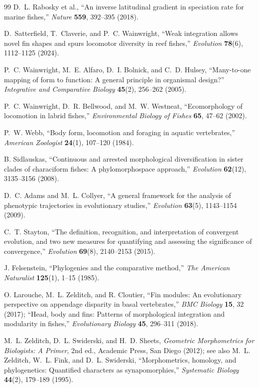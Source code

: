 \documentclass[11pt,a4paper]{article}
\theoremstyle{definition}
\theoremstyle{remark}
\begin{document}
\begin{thebibliography}{99}
D.~L. Rabosky et al., ``An inverse latitudinal gradient in speciation rate for marine fishes,'' \emph{Nature} \textbf{559}, 392--395 (2018).

D.~Satterfield, T.~Claverie, and P.~C. Wainwright, ``Weak integration allows novel fin shapes and spurs locomotor diversity in reef fishes,'' \emph{Evolution} \textbf{78}(6), 1112--1125 (2024).

P.~C. Wainwright, M.~E. Alfaro, D.~I. Bolnick, and C.~D. Hulsey, ``Many-to-one mapping of form to function: A general principle in organismal design?'' \emph{Integrative and Comparative Biology} \textbf{45}(2), 256--262 (2005).

P.~C. Wainwright, D.~R. Bellwood, and M.~W. Westneat, ``Ecomorphology of locomotion in labrid fishes,'' \emph{Environmental Biology of Fishes} \textbf{65}, 47--62 (2002).

P.~W. Webb, ``Body form, locomotion and foraging in aquatic vertebrates,'' \emph{American Zoologist} \textbf{24}(1), 107--120 (1984).

B. Sidlauskas, ``Continuous and arrested morphological diversification in sister clades of characiform fishes: A phylomorphospace approach,'' \emph{Evolution} \textbf{62}(12), 3135--3156 (2008).

D.~C. Adams and M.~L. Collyer, ``A general framework for the analysis of phenotypic trajectories in evolutionary studies,'' \emph{Evolution} \textbf{63}(5), 1143--1154 (2009).

C.~T. Stayton, ``The definition, recognition, and interpretation of convergent evolution, and two new measures for quantifying and assessing the significance of convergence,'' \emph{Evolution} \textbf{69}(8), 2140--2153 (2015).

J. Felsenstein, ``Phylogenies and the comparative method,'' \emph{The American Naturalist} \textbf{125}(1), 1--15 (1985).

O. Larouche, M.~L. Zelditch, and R. Cloutier, ``Fin modules: An evolutionary perspective on appendage disparity in basal vertebrates,'' \emph{BMC Biology} \textbf{15}, 32 (2017); ``Head, body and fins: Patterns of morphological integration and modularity in fishes,'' \emph{Evolutionary Biology} \textbf{45}, 296--311 (2018).

M.~L. Zelditch, D.~L. Swiderski, and H.~D. Sheets, \emph{Geometric Morphometrics for Biologists: A Primer}, 2nd ed., Academic Press, San Diego (2012); see also M.~L. Zelditch, W.~L. Fink, and D.~L. Swiderski, ``Morphometrics, homology, and phylogenetics: Quantified characters as synapomorphies,'' \emph{Systematic Biology} \textbf{44}(2), 179--189 (1995).


\end{thebibliography}
\end{document}
